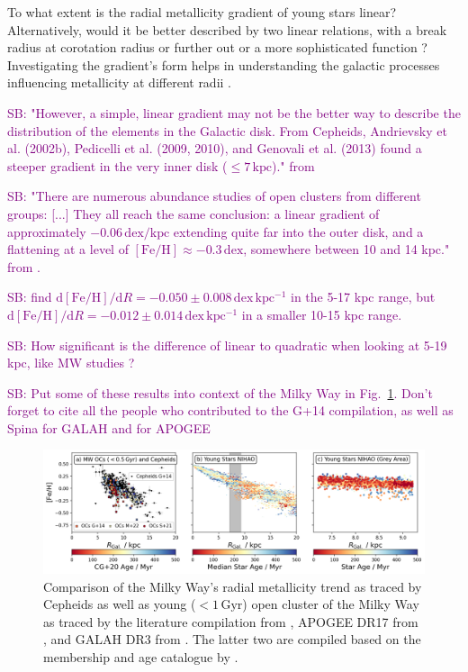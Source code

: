 \documentclass[fleqn,usenatbib]{mnras}
\newcommand{\SB}[1]{{\textcolor{purple}{SB: #1}}}
\begin{document}
To what extent is the radial metallicity gradient of young stars linear? Alternatively, would it be better described by two linear relations, with a break radius at corotation radius \citep[][and references therein]{Bresolin2012} or further out \citep{Donor2020} or a more sophisticated function \citep[see e.g.][]{Chiappini2001, Kubryk2015}? Investigating the gradient's form helps in understanding the galactic processes influencing metallicity at different radii \citep{Minchev2014b}.

\SB{"However, a simple, linear gradient may not be the better way to describe the distribution of the elements in the Galactic disk. From Cepheids, Andrievsky et al. (2002b), Pedicelli et al. (2009, 2010), and Genovali et al. (2013) found a steeper gradient in the very inner disk ($\leq 7\,\mathrm{kpc}$)." from \citet{Lemasle2013}}

\SB{"There are numerous abundance studies of open clusters from different groups: [...] They all reach the same conclusion: a linear gradient of approximately $-0.06\,\mathrm{dex/kpc}$ extending quite far into the outer disk, and a flattening at a level of $\mathrm{[Fe/H]} \approx -0.3\,\mathrm{dex}$, somewhere between 10 and 14 kpc." from \citet{Lemasle2013}.}

\SB{\citet{Lemasle2008} find $\mathrm{d[Fe/H]}/\mathrm{d}R = -0.050 \pm 0.008\,\mathrm{dex\,kpc^{-1}}$ in the 5-17 kpc range, but $\mathrm{d[Fe/H]}/\mathrm{d}R = -0.012 \pm 0.014\,\mathrm{dex\,kpc^{-1}}$ in a smaller 10-15 kpc range.}

\SB{How significant is the difference of linear to quadratic when looking at 5-19 kpc, like MW studies \citep{Genovali2014}?}

\SB{Put some of these results into context of the Milky Way in Fig.~\ref{fig:radial_metallicity_gradients_mw_vs_nihao}. Don't forget to cite all the people who contributed to the G+14 compilation, as well as Spina for GALAH and \citet{Myers2022, Donor2020} for APOGEE}

\begin{figure}
    \centering
    \includegraphics[width=\textwidth]{figures/radial_metallicity_gradients_mw_vs_nihao.png}
    \caption{Comparison of the Milky Way's radial metallicity trend as traced by Cepheids \citep[black triangles, compiled from literature by][G+14]{Genovali2014} as well as young ($< 1\,\mathrm{Gyr}$) open cluster of the Milky Way as traced by the literature compilation from \citet[][G+14 as squares]{Genovali2014}, APOGEE DR17 from \citet[][M+22 as crosses]{Myers2022}, and GALAH DR3 from \citet[][S+21 as circles]{Spina2021}. The latter two are compiled based on the membership and age catalogue by \citet[][CG+20]{CantatGaudin2020}.
    }
    \label{fig:radial_metallicity_gradients_mw_vs_nihao}
\end{figure}
\end{document}
